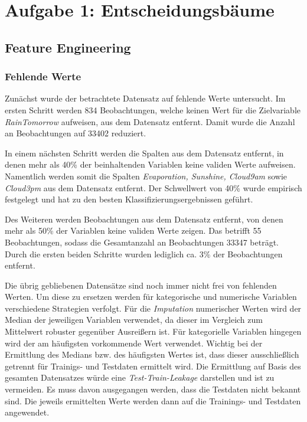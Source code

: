 \section{Aufgabe 1: Entscheidungsbäume}
\subsection{Feature Engineering}
\subsubsection{Fehlende Werte}

Zunächst wurde der betrachtete Datensatz auf fehlende Werte untersucht. Im ersten Schritt werden 834 Beobachtungen, welche keinen Wert für die Zielvariable \emph{RainTomorrow} aufweisen, aus dem Datensatz entfernt. Damit wurde die Anzahl an Beobachtungen auf 33402 reduziert.

\noindent \hspace*{7mm}
In einem nächsten Schritt werden die Spalten aus dem Datensatz entfernt, in denen mehr als 40\% der beinhaltenden Variablen keine validen Werte aufweisen. Namentlich werden somit die Spalten \emph{Evaporation, Sunshine, Cloud9am} sowie \emph{Cloud3pm} aus dem Datensatz entfernt. Der Schwellwert von 40\% wurde empirisch festgelegt und hat zu den besten Klassifizierungsergebnissen geführt.

\noindent \hspace*{7mm}
Des Weiteren werden Beobachtungen aus dem Datensatz entfernt, von denen mehr als 50\% der Variablen keine validen Werte zeigen. Das betrifft 55 Beobachtungen, sodass die Gesamtanzahl an Beobachtungen 33347 beträgt. Durch die ersten beiden Schritte wurden lediglich ca. 3\% der Beobachtungen entfernt.

\noindent \hspace*{7mm}
Die übrig gebliebenen Datensätze sind noch immer nicht frei von fehlenden Werten. Um diese zu ersetzen werden für kategorische und numerische Variablen verschiedene Strategien verfolgt. Für die \emph{Imputation} numerischer Werten wird der Median der jeweiligen Variablen verwendet, da dieser im Vergleich zum Mittelwert robuster gegenüber Ausreißern ist. Für kategorielle Variablen hingegen wird der am häufigsten vorkommende Wert verwendet. Wichtig bei der Ermittlung des Medians bzw. des häufigsten Wertes ist, dass dieser ausschließlich getrennt für Trainigs- und Testdaten ermittelt wird. Die Ermittlung auf Basis des gesamten Datensatzes würde eine \emph{Test-Train-Leakage} darstellen und ist zu vermeiden. Es muss davon ausgegangen werden, dass die Testdaten nicht bekannt sind. Die jeweils ermittelten Werte werden dann auf die Trainings- und Testdaten angewendet.

